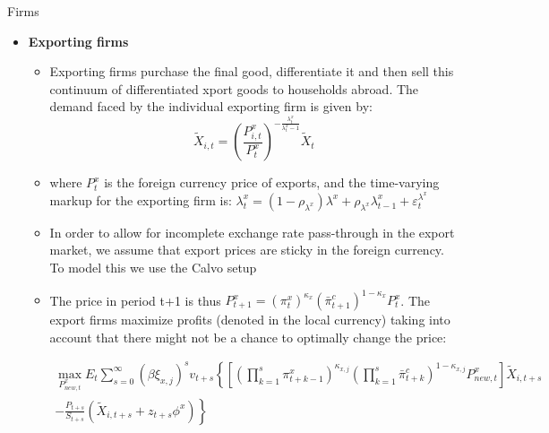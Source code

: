 \documentclass[9pt]{beamer}
\let\olditem\item
\renewcommand{\item}{%
\olditem\vspace{\fill}}
\begin{document}
\begin{frame}{Firms}
\begin{itemize}
    \item \textbf{Exporting firms} 
    \begin{itemize}
        \item Exporting firms purchase the final good, differentiate it and then sell this continuum of differentiated xport goods to households abroad. The demand faced by the individual exporting firm is given by:
$$
    \tilde{X}_{i, t}=\left(\frac{P_{i, t}^{x}}{P_{t}^{x}}\right)^{-\frac{\lambda_{t}^{x}}{\lambda_{t}^{x}-1}} \tilde{X}_{t}
$$    
    \item where $P_t^{x}$ is the foreign currency price of exports, and the time-varying markup for the exporting firm is: $\lambda_{t}^{x}=\left(1-\rho_{\lambda^{x}}\right) \lambda^{x}+\rho_{\lambda^{x}} \lambda_{t-1}^{x}+\varepsilon_{t}^{\lambda^{x}}$
    
    \item In order to allow for incomplete exchange rate pass-through in the export market, we assume that export prices are sticky in the foreign currency. To model this we use the Calvo setup
    
    \item  The price in period t+1 is thus $P_{t+1}^{x}=\left(\pi_{t}^{x}\right)^{\kappa_{x}}\left(\bar{\pi}_{t+1}^{c}\right)^{1-\kappa_{x}} P_{t}^{x}$. The export firms maximize profits (denoted in the local currency) taking into account that there might not be a chance to optimally change the price: 
    

$$\begin{array}{c}
    \max _{P_{new,t}^{x}} E_{t} \sum_{s=0}^{\infty}\left(\beta \xi_{x, j}\right)^{s} v_{t+s}\left\{\left[\left(\prod_{k=1}^{s} \pi_{t+k-1}^{x}\right)^{\kappa_{x, j}}\left(\prod_{k=1}^{s} \bar{\pi}_{t+k}^{c}\right)^{1-\kappa_{x, j}} P_{new,t}^{x}\right] \tilde{X}_{i, t+s}\right. \\
    \left.-\frac{P_{t+s}}{S_{t+s}}\left(\tilde{X}_{i, t+s}+z_{t+s} \phi^{x}\right)\right\}
    \end{array}
$$

    
\end{itemize}
\end{itemize}

\end{frame}
\end{document}
